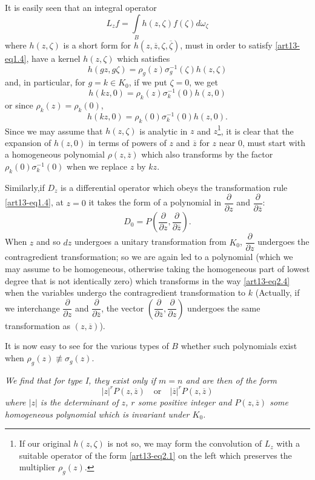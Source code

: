 It is easily seen that an integral operator
$$
L_{z}f=\int\limits_{B}h(z,\zeta) f(\zeta)d\omega_{\zeta}
$$
where $h(z,\zeta)$ is a short form for $h(z,\overline{z},\zeta,\overline{\zeta})$, must in order to satisfy \eqref{art13-eq1.4}, have a kernel $h(z,\zeta)$ which satisfies
\begin{equation}
h(gz,g\zeta)=\rho_{g}(z)\sigma^{-1}_{g}(\zeta)h(z,\zeta)\label{art13-eq2.3}
\end{equation}
and, in particular, for $g=k\in K_{0}$, if we put $\zeta=0$, we get
$$
h(kz,0)=\rho_{k}(z)\sigma^{-1}_{k}(0)h(z,0)
$$
or since $\rho_{k}(z)=\rho_{k}(0)$,
\begin{equation}
h(kz,0)=\rho_{k}(0)\sigma^{-1}_{k}(0)h(z,0).\label{art13-eq2.4}
\end{equation}
Since we may assume that $h(z,\zeta)$ is analytic in $z$ and $z$\footnote{If our original $h(z,\zeta)$ is not so, we may form the convolution of $L_{z}$ with a suitable operator of the form \eqref{art13-eq2.1} on the left which preserves the multiplier $\rho_{g}(z)$.}, it is clear that the expansion of $h(z,0)$ in terms of powers of $z$ and $\overline{z}$ for $z$ near $0$, must start with a homogeneous polynomial $\rho(z,\overline{z})$ which also transforms by the factor $\rho_{k}(0)\sigma^{-1}_{k}(0)$ when we replace $z$ by $kz$.

Similarly,\pageoriginale if $D_{z}$ is a differential operator which obeys the transformation rule \eqref{art13-eq1.4}, at $z=0$ it takes the form of a polynomial in $\dfrac{\partial}{\partial z}$ and $\dfrac{\partial}{\partial\overline{z}}$:
$$
D_{0}=P\left(\frac{\partial}{\partial z},\frac{\partial}{\partial\overline{z}}\right).
$$
When $z$ and so $dz$ undergoes a unitary transformation from $K_{0}$, $\dfrac{\partial}{\partial z}$ undergoes the contragredient transformation; so we are again led to a polynomial (which we may assume to be homogeneous, otherwise taking the homogeneous part of lowest degree that is not identically zero) which transforms in the way \eqref{art13-eq2.4} when the variables undergo the contragredient transformation to $k$ (Actually, if we interchange $\dfrac{\partial}{\partial z}$ and $\dfrac{\partial}{\partial\overline{z}}$, the vector $\left(\dfrac{\partial}{\partial\overline{z}},\dfrac{\partial}{\partial z}\right)$ undergoes the same transformation as $(z,\overline{z})$).

It is now easy to see for the various types of $B$ whether such polynomials exist when $\rho_{g}(z)\nequiv \sigma_{g}(z)$.

{\em We find that for type I, they exist only if $m=n$ and are then of the form}
$$
|z|^{r}P(z,\overline{z})\quad\text{or}\quad |\overline{z}|^{r}P(z,\overline{z})
$$
{\em where $|z|$ is the determinant of $z$, $r$ some positive integer and $P(z,\overline{z})$ some homogeneous polynomial which is invariant under $K_{0}$.}

